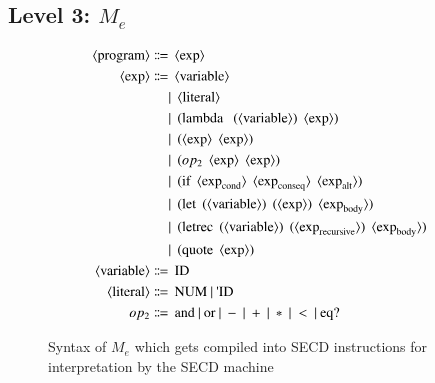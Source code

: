\documentclass[a4paper,12pt,twoside,openright]{report}
\theoremstyle{definition}
\newcommand{\ts}{\textquotesingle}
\newcommand{\mevl}{$M_{e}$}
\begin{document}
\subsection{Level 3: \texorpdfstring{\mevl}{Lg}}\label{subsec:mevl}
\begin{figure}[ht!]
\begin{align*}
	\langle \text{program} \rangle \Coloneqq & \:\: \langle \text{exp} \rangle \\
	\langle \text{exp} \rangle \Coloneqq & \:\: \langle \text{variable} \rangle \\
															   & | \:\: \langle \text{literal} \rangle \\
															   & | \:\: \text{(lambda \: (} \langle \text{variable} \rangle\text{)} \:\: \langle \text{exp} \rangle\text{)} \\
															   & | \:\: \text{(} \langle \text{exp} \rangle \:\: \langle \text{exp} \rangle \text{)} \\
															   & | \:\: \text{(} op_{2} \:\: \langle \text{exp} \rangle \:\: \langle \text{exp} \rangle \text{)} \\
															   & | \:\: \text{(if} \:\: \langle \text{exp}_\text{cond} \rangle \:\: \langle \text{exp}_\text{conseq} \rangle \:\: \langle \text{exp}_\text{alt} \rangle \text{)} \\
															   & | \:\: \text{(let} \:\: \text{(} \langle \text{variable} \rangle \text{)} \:\: \text{(}\langle \text{exp} \rangle \text{)} \:\: \langle \text{exp}_\text{body} \rangle \text{)} \\
															   & | \:\: \text{(letrec} \:\: \text{(} \langle \text{variable} \rangle \text{)} \:\: \text{(}\langle \text{exp}_\text{recursive} \rangle \text{)} \:\: \langle \text{exp}_\text{body} \rangle \text{)} \\
															   & | \:\: \text{(quote} \:\: \langle \text{exp} \rangle \text{)} \\
	\langle \text{variable} \rangle \Coloneqq & \:\: \text{ID} \\
	\langle \text{literal} \rangle \Coloneqq & \:\: \text{NUM} \: | \: \text{{\ts}ID} \\
	op_{2} \Coloneqq & \:\: \text{and} \: | \: \text{or} \: | \: - \: | \: + \: | \: * \: | \: < \: | \: \text{eq?}
\end{align*}
\caption{Syntax of \mevl{} which gets compiled into SECD instructions for interpretation by the SECD machine}
\label{fig:mevl_syntax}
\end{figure}
\end{document}
